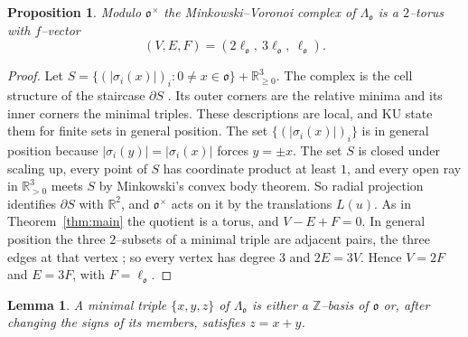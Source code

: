 \documentclass[11pt,reqno]{amsart}
\theoremstyle{plain}
\newtheorem{proposition}[theorem]{Proposition}
\newtheorem{lemma}[theorem]{Lemma}
\theoremstyle{definition}
\newcommand{\Z}{\mathbb{Z}}
\newcommand{\R}{\mathbb{R}}
\newcommand{\Ok}{\mathfrak{o}}
\newcommand{\bdy}{\partial}
\begin{document}
\begin{proposition}\label{prop:mv}
Modulo $\Ok^\times$ the Minkowski--Voronoi complex of $\Lambda_\Ok$ is a $2$--torus with $f$--vector
\[
(V,E,F)=(2\ell_\Ok,\ 3\ell_\Ok,\ \ell_\Ok).
\]
\end{proposition}

\begin{proof}
Let $S=\{(|\sigma_i(x)|)_i:0\ne x\in\Ok\}+\R^3_{\ge0}$. The complex is the cell structure of the staircase
$\bdy S$ \cite[Def.~2.8, Prop.~2.11]{KU}. Its outer corners are the relative minima and its inner corners
the minimal triples. These descriptions are local, and KU state them for finite sets in general position.
The set $\{(|\sigma_i(x)|)_i\}$ is in general position because $|\sigma_i(y)|=|\sigma_i(x)|$ forces
$y=\pm x$. The set $S$ is closed under scaling up, every point of $S$ has coordinate product at least $1$, and
every open ray in $\R^3_{>0}$ meets $S$ by Minkowski's convex body theorem. So radial projection identifies
$\bdy S$ with $\R^2$, and $\Ok^\times$ acts on it by the translations
$L(u)$. As in Theorem~\ref{thm:main} the quotient is a torus, and $V-E+F=0$. In general position the three
$2$--subsets of a minimal triple are adjacent pairs, the three edges at that vertex \cite[\S2.3.1]{KU}; so
every vertex has degree $3$ and $2E=3V$. Hence $V=2F$ and $E=3F$, with $F=\ell_\Ok$.
\end{proof}

\begin{lemma}\label{lem:triples}
A minimal triple $\{x,y,z\}$ of $\Lambda_\Ok$ is either a $\Z$--basis of $\Ok$ or, after changing the signs
of its members, satisfies $z=x+y$.
\end{lemma}
\end{document}
